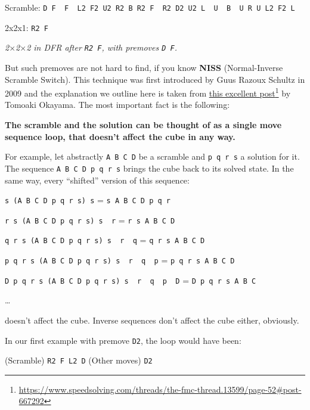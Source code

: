 \documentclass[11pt,a4paper]{book}
\newcommand{\p}{\textquotesingle}
\newcommand{\m}{\texttt}
\newcommand{\ps}{\p\,\,}
\begin{document}
\begin{center}
Scramble: \m{D F\ps F\ps L2 F2 U2 R2 B R2 F\ps R2 D2 U2 L\ps U\ps B\ps U R U L2 F2 L\p}

2x2x1: \m{R2 F}



\emph{2$\times$2$\times$2 in DFR after \m{R2 F}, with premoves \m{D F\p}.}
\end{center}

But such premoves are not hard to find, if you know \textbf{NISS} (Normal-Inverse Scramble Switch). This technique was first introduced by Guus Razoux Schultz in 2009 and the explanation we outline here is taken from \href{https://www.speedsolving.com/threads/the-fmc-thread.13599/page-52##post-667292}{this excellent post}\footnote{\url{https://www.speedsolving.com/threads/the-fmc-thread.13599/page-52\#post-667292}} by Tomoaki Okayama. The most important fact is the following:

\begin{framed}
\textbf{The scramble and the solution can be thought of as a single move sequence loop, that doesn't affect the cube in any way.}
\end{framed}

For example, let abstractly \m{A B C D} be a scramble and \m{p q r s} a solution for it. The sequence \m{A B C D p q r s} brings the cube back to its solved state. In the same way, every ``shifted'' version of this sequence:

\begin{center}
\m{s (A B C D p q r s) s\p} = \m{s A B C D p q r}

\m{r s (A B C D p q r s) s\ps r\p} = \m{r s A B C D}

\m{q r s (A B C D p q r s) s\ps r\ps q\p} = \m{q r s A B C D}

\m{p q r s (A B C D p q r s) s\ps r\ps q\ps p\p} = \m{p q r s A B C D}

\m{D p q r s (A B C D p q r s) s\ps r\ps q\ps p\ps D\p} = \m{D p q r s A B C}

\dots
\end{center}

doesn't affect the cube. Inverse sequences don't affect the cube either, obviously.

In our first example with premove \m{D2}, the loop would have been:

\begin{center}
(Scramble) \m{R2 F L2 D\p} (Other moves) \m{D2}
\end{center}
\end{document}
